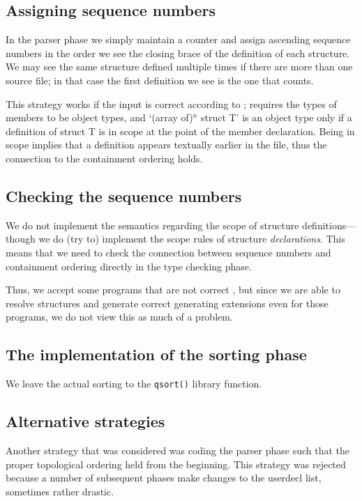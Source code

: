 \begin{docpart}
\subsection{Assigning sequence numbers}

In the parser phase we simply maintain a counter and assign ascending
sequence numbers in the order we see the closing brace of the
definition of each structure. We may see the same structure defined
multiple times if there are more than one source file; in that case
the first definition we see is the one that counts.

This strategy works if the input is correct according to \ansiC;
\ansiC requires the types of members to be object types, and
`(array of)$^n$ struct T' is an object type only if a definition
of struct T is in scope at the point of the member declaration.
Being in scope implies that a definition appears textually earlier in
the file, thus the connection to the containment ordering holds.

\subsection{Checking the sequence numbers}

We do not implement the \ansiC semantics regarding the scope of
structure definitions---though we do (try to) implement the scope
rules of structure \emph{declarations}. This means that we need to
check the connection between sequence numbers and containment ordering
directly in the type checking phase.

Thus, we accept some programs that are not correct \ansiC, but since
we are able to resolve structures and generate correct generating
extensions even for those programs, we do not view this as much of
a problem.

\subsection{The implementation of the sorting phase}

We leave the actual sorting to the \texttt{qsort()} library function.

\subsection{Alternative strategies}

Another strategy that was considered was coding the parser phase such
that the proper topological ordering held from the beginning.
This strategy was rejected because a number of subsequent phases
make changes to the userdecl list, sometimes rather drastic.


\end{docpart}
